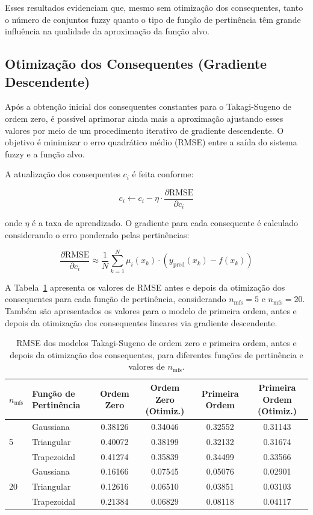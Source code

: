 Esses resultados evidenciam que, mesmo sem otimização dos consequentes, tanto o número de conjuntos fuzzy quanto o tipo de função de pertinência têm grande influência na qualidade da aproximação da função alvo.

\subsection{Otimização dos Consequentes (Gradiente Descendente)}

Após a obtenção inicial dos consequentes constantes para o Takagi-Sugeno de ordem zero, é possível aprimorar ainda mais a aproximação ajustando esses valores por meio de um procedimento iterativo de gradiente descendente. O objetivo é minimizar o erro quadrático médio (RMSE) entre a saída do sistema fuzzy e a função alvo.

A atualização dos consequentes $c_i$ é feita conforme:

\[
c_i \leftarrow c_i - \eta \cdot \frac{\partial \mathrm{RMSE}}{\partial c_i}
\]

onde $\eta$ é a taxa de aprendizado. O gradiente para cada consequente é calculado considerando o erro ponderado pelas pertinências:

\[
\frac{\partial \mathrm{RMSE}}{\partial c_i} \approx \frac{1}{N} \sum_{k=1}^N \mu_i(x_k) \cdot (y_{\text{pred}}(x_k) - f(x_k))
\]

A Tabela~\ref{tab:rmse_otimizacao} apresenta os valores de RMSE antes e depois da otimização dos consequentes para cada função de pertinência, considerando $n_\text{mfs}=5$ e $n_\text{mfs}=20$. Também são apresentados os valores para o modelo de primeira ordem, antes e depois da otimização dos consequentes lineares via gradiente descendente.

\begin{table}[ht]
    \centering
    \caption{RMSE dos modelos Takagi-Sugeno de ordem zero e primeira ordem, antes e depois da otimização dos consequentes, para diferentes funções de pertinência e valores de $n_\text{mfs}$.}
    \label{tab:rmse_otimizacao}
    \begin{tabular}{llcccc}
        \toprule
        \textbf{$n_\text{mfs}$} & \textbf{Função de Pertinência} & \textbf{Ordem Zero} & \textbf{Ordem Zero (Otimiz.)} & \textbf{Primeira Ordem} & \textbf{Primeira Ordem (Otimiz.)} \\
        \midrule
        \multirow{3}{*}{5}  & Gaussiana   & 0.38126 & 0.34046 & 0.32552 & 0.31143 \\
                            & Triangular  & 0.40072 & 0.38199 & 0.32132 & 0.31674 \\
                            & Trapezoidal & 0.41274 & 0.35839 & 0.34499 & 0.33566 \\
        \midrule
        \multirow{3}{*}{20} & Gaussiana   & 0.16166 & 0.07545 & 0.05076 & 0.02901 \\
                            & Triangular  & 0.12616 & 0.06510 & 0.03851 & 0.03103 \\
                            & Trapezoidal & 0.21384 & 0.06829 & 0.08118 & 0.04117 \\
        \bottomrule
    \end{tabular}
\end{table}

